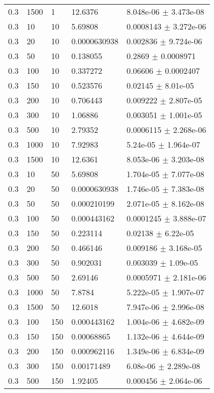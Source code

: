 \begin{longtable}{lllll}
 0.3 &  1500 &     1 &  12.6376 & 8.048e-06 $\pm$ 3.473e-08 \\
 0.3 &    10 &    10 &  5.69808 & 0.0008143 $\pm$ 3.272e-06 \\
 0.3 &    20 &    10 & 0.0000630938 & 0.002836 $\pm$ 9.724e-06 \\
 0.3 &    50 &    10 & 0.138055 &   0.2869 $\pm$ 0.0008971 \\
 0.3 &   100 &    10 & 0.337272 &  0.06606 $\pm$ 0.0002407 \\
 0.3 &   150 &    10 & 0.523576 &  0.02145 $\pm$ 8.01e-05 \\
 0.3 &   200 &    10 & 0.706443 & 0.009222 $\pm$ 2.807e-05 \\
 0.3 &   300 &    10 &  1.06886 & 0.003051 $\pm$ 1.001e-05 \\
 0.3 &   500 &    10 &  2.79352 & 0.0006115 $\pm$ 2.268e-06 \\
 0.3 &  1000 &    10 &  7.92983 & 5.24e-05 $\pm$ 1.964e-07 \\
 0.3 &  1500 &    10 &  12.6361 & 8.053e-06 $\pm$ 3.203e-08 \\
 0.3 &    10 &    50 &  5.69808 & 1.704e-05 $\pm$ 7.077e-08 \\
 0.3 &    20 &    50 & 0.0000630938 & 1.746e-05 $\pm$ 7.383e-08 \\
 0.3 &    50 &    50 & 0.000210199 & 2.071e-05 $\pm$ 8.162e-08 \\
 0.3 &   100 &    50 & 0.000443162 & 0.0001245 $\pm$ 3.888e-07 \\
 0.3 &   150 &    50 & 0.223114 &  0.02138 $\pm$ 6.22e-05 \\
 0.3 &   200 &    50 & 0.466146 & 0.009186 $\pm$ 3.168e-05 \\
 0.3 &   300 &    50 & 0.902031 & 0.003039 $\pm$ 1.09e-05 \\
 0.3 &   500 &    50 &  2.69146 & 0.0005971 $\pm$ 2.181e-06 \\
 0.3 &  1000 &    50 &   7.8784 & 5.222e-05 $\pm$ 1.907e-07 \\
 0.3 &  1500 &    50 &  12.6018 & 7.947e-06 $\pm$ 2.996e-08 \\
 0.3 &   100 &   150 & 0.000443162 & 1.004e-06 $\pm$ 4.682e-09 \\
 0.3 &   150 &   150 & 0.00068865 & 1.132e-06 $\pm$ 4.644e-09 \\
 0.3 &   200 &   150 & 0.000962116 & 1.349e-06 $\pm$ 6.834e-09 \\
 0.3 &   300 &   150 & 0.00171489 & 6.08e-06 $\pm$ 2.289e-08 \\
 0.3 &   500 &   150 &  1.92405 & 0.000456 $\pm$ 2.064e-06 \\

\end{longtable}
